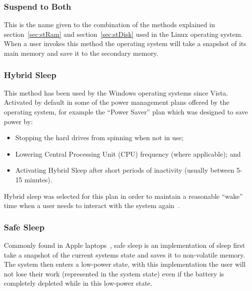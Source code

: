 \documentclass[a4paper,12pt]{article}
\begin{document}
\subsubsection{Suspend to Both}\label{sec:stBoth}
This is the name given to the combination of the methods explained in section~\ref{sec:stRam} and section~\ref{sec:stDisk} used in the Linux operating system. When a user invokes this method the operating system will take a snapshot of its main memory and save it to the secondary memory.
\subsubsection{Hybrid Sleep}\label{sec:hybridsleep}
This method has been used by the Windows operating systems since Vista. Activated by default in some of the power management plans offered by the operating system, for example the ``Power Saver'' plan which was designed to save power by:
\begin{itemize}
    \item{Stopping the hard drives from spinning when not in use;}
    \item{Lowering Central Processing Unit (CPU) frequency (where applicable); and}
    \item{Activating Hybrid Sleep after short periods of inactivity (usually between 5-15 minutes).}
\end{itemize}
Hybrid sleep was selected for this plan in order to maintain a reasonable ``wake'' time when a user needs to interact with the system again~\citep{windowssleepandhibernation}.
\subsubsection{Safe Sleep}\label{sec:safesleep}
Commonly found in Apple laptops~\citep{safesleep}, safe sleep is an implementation of sleep first take a snapshot of the current systems state and saves it to non-volatile memory. The system then enters a low-power state, with this implementation the user will not lose their work (represented in the system state) even if the battery is completely depleted while in this low-power state.
\end{document}
